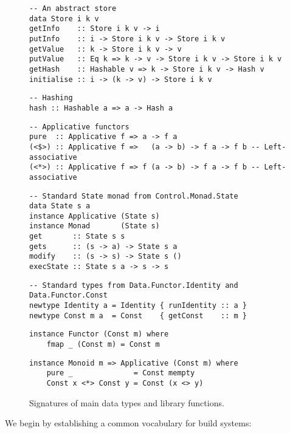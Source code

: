 \begin{figure}
\begin{verbatim}
-- An abstract store
data Store i k v
getInfo    :: Store i k v -> i
putInfo    :: i -> Store i k v -> Store i k v
getValue   :: k -> Store i k v -> v
putValue   :: Eq k => k -> v -> Store i k v -> Store i k v
getHash    :: Hashable v => k -> Store i k v -> Hash v
initialise :: i -> (k -> v) -> Store i k v
\end{verbatim}
\vspace{1mm}
\begin{verbatim}
-- Hashing
hash :: Hashable a => a -> Hash a
\end{verbatim}
\vspace{1mm}
\begin{verbatim}
-- Applicative functors
pure  :: Applicative f => a -> f a
(<$>) :: Applicative f =>   (a -> b) -> f a -> f b -- Left-associative
(<*>) :: Applicative f => f (a -> b) -> f a -> f b -- Left-associative
\end{verbatim}
\vspace{1mm}
\begin{verbatim}
-- Standard State monad from Control.Monad.State
data State s a
instance Applicative (State s)
instance Monad       (State s)
get       :: State s s
gets      :: (s -> a) -> State s a
modify    :: (s -> s) -> State s ()
execState :: State s a -> s -> s
\end{verbatim}
\vspace{1mm}
\begin{verbatim}
-- Standard types from Data.Functor.Identity and Data.Functor.Const
newtype Identity a = Identity { runIdentity :: a }
newtype Const m a  = Const    { getConst    :: m }
\end{verbatim}
\vspace{0.5mm}
\begin{verbatim}
instance Functor (Const m) where
    fmap _ (Const m) = Const m
\end{verbatim}
\vspace{0.5mm}
\begin{verbatim}
instance Monoid m => Applicative (Const m) where
    pure _              = Const mempty
    Const x <*> Const y = Const (x <> y)
\end{verbatim}
\vspace{-3mm}
\caption{Signatures of main data types and library functions.}\label{fig-types}
\vspace{-4mm}
\end{figure}
We begin by establishing a common vocabulary for build systems:

